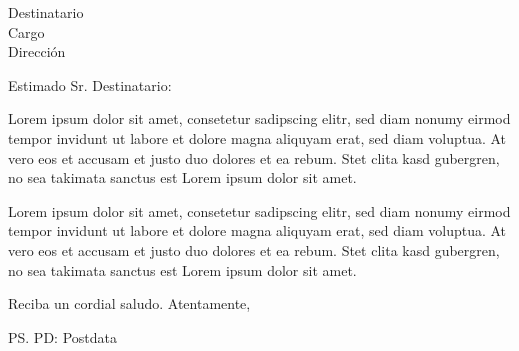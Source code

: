 \documentclass{scrlttr2}
\begin{document}
\begin{letter}{
   Destinatario\\  Cargo \\  Dirección }

\opening{Estimado Sr. Destinatario:}  

Lorem ipsum dolor sit amet, consetetur sadipscing elitr, sed diam nonumy eirmod
tempor invidunt ut labore et dolore magna aliquyam erat, sed diam voluptua. At
vero eos et accusam et justo duo dolores et ea rebum. Stet clita kasd gubergren,
no sea takimata sanctus est Lorem ipsum dolor sit amet.

Lorem ipsum dolor sit amet, consetetur sadipscing elitr, sed diam nonumy eirmod
tempor invidunt ut labore et dolore magna aliquyam erat, sed diam voluptua. At
vero eos et accusam et justo duo dolores et ea rebum. Stet clita kasd gubergren,
no sea takimata sanctus est Lorem ipsum dolor sit amet.


\closing{Reciba un cordial saludo. Atentamente,} 

\ps PD: Postdata

\end{letter}
\end{document}
